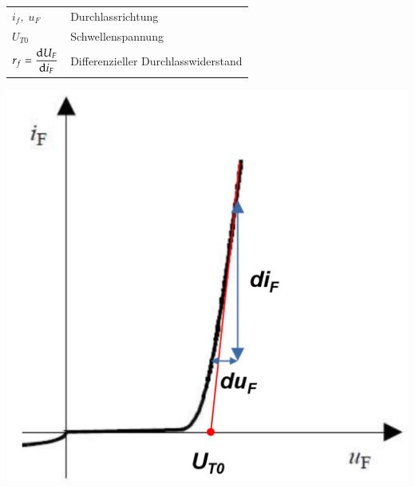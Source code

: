 \begin{multicols}{2}
     \begin{minipage}{\linewidth}
         \begin{tabular}{ll}
             $ i_f ,\; u_F $& Durchlassrichtung\\
             $ U_{T0} $& Schwellenspannung\\
             $ r_f= \dfrac{\mathop{}\!\mathrm{d} U_F}{\mathop{}\!\mathrm{d} i_F} $& Differenzieller Durchlasswiderstand\\
            \end{tabular}       
    \end{minipage}
        
        \includegraphics[width=0.4\linewidth]{images/dDiodeKennlinie}
\end{multicols}
\vspace{-1.5cm}
